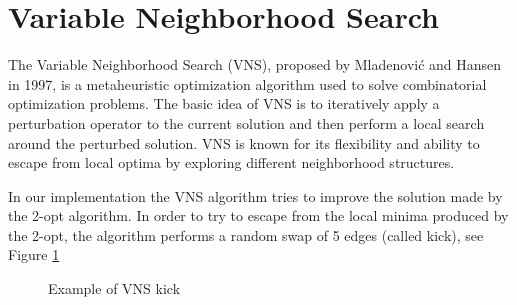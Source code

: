 \section{Variable Neighborhood Search}
The Variable Neighborhood Search (VNS), proposed by Mladenović and Hansen in 1997,  is a metaheuristic optimization algorithm used to solve combinatorial optimization problems. The basic idea of VNS is to iteratively apply a perturbation operator to the current solution and then perform a local search around the perturbed solution. VNS is known for its flexibility and ability to escape from local optima by exploring different neighborhood structures.

In our implementation the VNS algorithm tries to improve the solution made by the 2-opt algorithm. In order to try to escape from the local minima produced by the 2-opt, the algorithm performs a random swap of 5 edges (called kick), see Figure \ref{fig:VNS} %


\begin{figure}[!h]
    \centering
    \caption{Example of VNS kick} \label{fig:VNS}
\end{figure}



